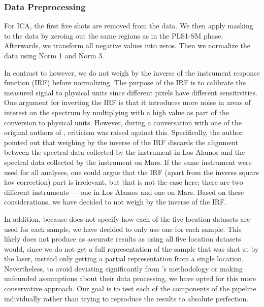 \subsubsection{Data Preprocessing}\label{sec:ica_data_preprocessing}
For ICA, the first five shots are removed from the data.
We then apply masking to the data by zeroing out the same regions as in the PLS1-SM phase.
Afterwards, we transform all negative values into zeros.
Then we normalize the data using Norm 1 and Norm 3.

In contrast to \citet{cleggRecalibrationMarsScience2017} however, we do not weigh by the inverse of the instrument response function (IRF) before normalizing.
The purpose of the IRF is to calibrate the measured signal to physical units since different pixels have different sensitivities\cite{wiensChemcam2012}.
One argument for inverting the IRF is that it introduces more noise in areas of interest on the spectrum by multiplying with a high value as part of the conversion to physical units.
However, during a conversation with one of the original authors of \citet{cleggRecalibrationMarsScience2017}, criticism was raised against this.
Specifically, the author pointed out that weighing by the inverse of the IRF discards the alignment between the spectral data collected by the instrument in Los Alamos and the spectral data collected by the instrument on Mars.
If the same instrument were used for all analyses, one could argue that the IRF (apart from the inverse square law correction) part is irrelevant, but that is not the case here; there are two different instruments --- one in Los Alamos and one on Mars.
Based on these considerations, we have decided to not weigh by the inverse of the IRF.

In addition, because \citet{cleggRecalibrationMarsScience2017} does not specify how each of the five location datasets are used for each sample, we have decided to only use one for each sample.
This likely does not produce as accurate results as using all five location datasets would, since we do not get a full representation of the sample that was shot at by the laser, instead only getting a partial representation from a single location.
Nevertheless, to avoid deviating significantly from \citet{cleggRecalibrationMarsScience2017}'s methodology or making unfounded assumptions about their data processing, we have opted for this more conservative approach.
Our goal is to test each of the components of the pipeline individually rather than trying to reproduce the results to absolute perfection.

